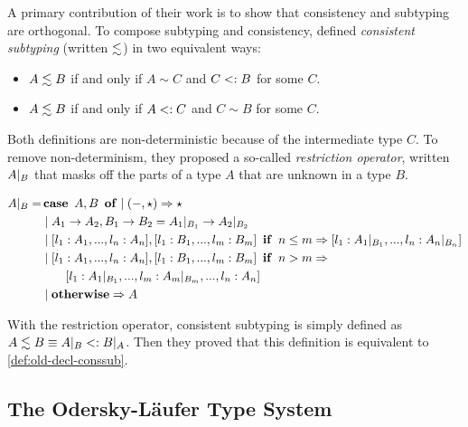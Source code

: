 A primary contribution of their work is to show that consistency and subtyping
are orthogonal. To compose subtyping and consistency,
\citeauthor{siek2007gradual} defined \textit{consistent subtyping} (written
$\lesssim$) in two equivalent ways:
\begin{definition}\leavevmode
\label{def:old-decl-conssub}
\begin{itemize}
\item $A \lesssim B$ if and only if $A \sim C$ and $C <: B$ for some $C$.
\item $A \lesssim B$ if and only if $A <: C$ and $C \sim B$ for some $C$.
\end{itemize}
\end{definition}
Both definitions are non-deterministic because of the intermediate type $C$. To
remove non-determinism, they proposed a so-called \textit{restriction
  operator}, written ${A}|_{B}$ that masks off the parts of a type $A$
that are unknown in a type $B$.
\begin{small}
\begin{align*}
   {A}|_{B} = & \operatorname{\mathbf{case}}~A, B~\operatorname{\mathbf{of}}  \mid (-, \star) \Rightarrow \star\\
               & \mid A_1 \to A_2, B_1 \to B_2  =  {A_1}|_{B_1} \to {A_2}|_{B_2} \\
               & \mid [l_1: A_1,...,l_n:A_n], [l_1:B_1,...,l_m:B_m]~\operatorname{\mathbf{if}}~n \leq m \Rightarrow
                [l_1 : {A_1}|_{B_1}, ..., l_n : {A_n}|_{B_n}]\\
               & \mid [l_1: A_1,...,l_n:A_n], [l_1:B_1,...,l_m:B_m]~\operatorname{\mathbf{if}}~n > m \Rightarrow\\
               & \qquad [l_1 : {A_1}|_{B_1}, ..., l_m : {A_m}|_{B_m},...,l_n:A_n ]\\
               & \mid \operatorname{\mathbf{otherwise}} \Rightarrow A
\end{align*}
\end{small}
With the restriction operator, consistent subtyping is simply defined
as $A \lesssim B \equiv {A}|_{B} <: {B}|_{A}$. Then they proved that this
definition is equivalent to \cref{def:old-decl-conssub}.


\subsection{The Odersky-L{\"a}ufer Type System}

